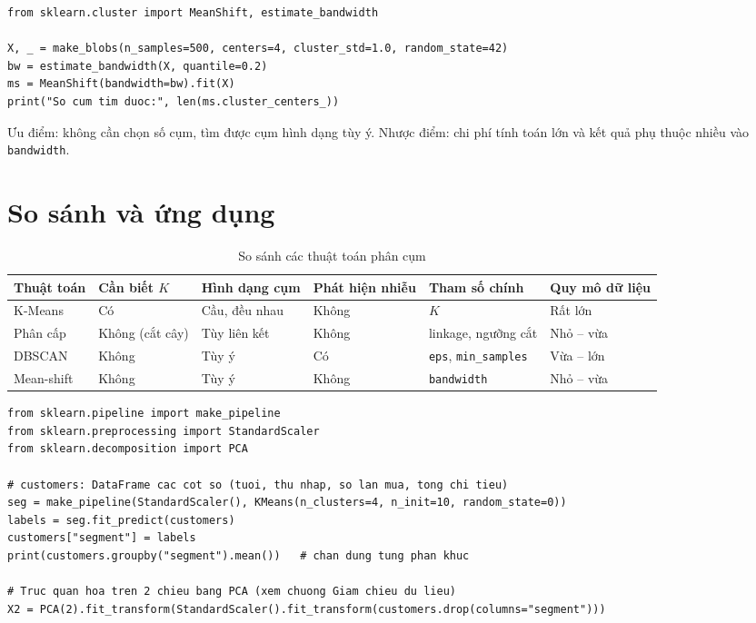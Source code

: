 \begin{lstlisting}[caption={Mean-shift với ước lượng bandwidth}]
from sklearn.cluster import MeanShift, estimate_bandwidth

X, _ = make_blobs(n_samples=500, centers=4, cluster_std=1.0, random_state=42)
bw = estimate_bandwidth(X, quantile=0.2)
ms = MeanShift(bandwidth=bw).fit(X)
print("So cum tim duoc:", len(ms.cluster_centers_))
\end{lstlisting}

Ưu điểm: không cần chọn số cụm, tìm được cụm hình dạng tùy ý. Nhược điểm: chi phí tính toán lớn và kết quả phụ thuộc nhiều vào \texttt{bandwidth}.

\section{So sánh và ứng dụng}

\begin{table}[H]
\centering
\small
\begin{tabular}{|p{2.3cm}|p{1.6cm}|p{2.1cm}|p{1.6cm}|p{2.2cm}|p{2.6cm}|}
\hline
\textbf{Thuật toán} & \textbf{Cần biết $K$} & \textbf{Hình dạng cụm} & \textbf{Phát hiện nhiễu} & \textbf{Tham số chính} & \textbf{Quy mô dữ liệu} \\
\hline
K-Means & Có & Cầu, đều nhau & Không & $K$ & Rất lớn \\ \hline
Phân cấp & Không (cắt cây) & Tùy liên kết & Không & linkage, ngưỡng cắt & Nhỏ -- vừa \\ \hline
DBSCAN & Không & Tùy ý & Có & \texttt{eps}, \texttt{min\_samples} & Vừa -- lớn \\ \hline
Mean-shift & Không & Tùy ý & Không & \texttt{bandwidth} & Nhỏ -- vừa \\ \hline
\end{tabular}
\caption{So sánh các thuật toán phân cụm}
\end{table}


\begin{lstlisting}[caption={Phân khúc khách hàng: tiền xử lý rồi phân cụm}]
from sklearn.pipeline import make_pipeline
from sklearn.preprocessing import StandardScaler
from sklearn.decomposition import PCA

# customers: DataFrame cac cot so (tuoi, thu nhap, so lan mua, tong chi tieu)
seg = make_pipeline(StandardScaler(), KMeans(n_clusters=4, n_init=10, random_state=0))
labels = seg.fit_predict(customers)
customers["segment"] = labels
print(customers.groupby("segment").mean())   # chan dung tung phan khuc

# Truc quan hoa tren 2 chieu bang PCA (xem chuong Giam chieu du lieu)
X2 = PCA(2).fit_transform(StandardScaler().fit_transform(customers.drop(columns="segment")))
\end{lstlisting}

